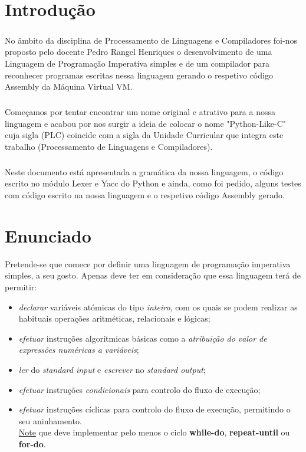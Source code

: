 \documentclass[11pt,a4paper]{report}
\begin{document}
    \tableofcontents

    \pagebreak


    \chapter{Introdução}
    \paragraph{}
    No âmbito da disciplina de Processamento de Linguagens e Compiladores foi-nos proposto pelo docente Pedro Rangel Henriques o desenvolvimento de uma Linguagem de Programação Imperativa simples e de um compilador para reconhecer programas escritas nessa linguagem gerando o respetivo código Assembly da Máquina Virtual VM.
    \paragraph{}
    Começamos por tentar encontrar um nome original e atrativo para a nossa linguagem e acabou por nos surgir a ideia de colocar o nome "Python-Like-C" cuja sigla (PLC) coincide com a sigla da Unidade Curricular que integra este trabalho (Processamento de Linguagens e Compiladores).
    \paragraph{}
    Neste documento está apresentada a gramática da nossa linguagem, o código escrito no módulo Lexer e Yacc do Python e ainda, como foi pedido, alguns testes com código escrito na nossa linguagem e o respetivo código Assembly gerado.


    \chapter{Enunciado}
    Pretende-se que comece por definir uma linguagem de programação imperativa simples, a seu gosto.
    Apenas deve ter em consideração que essa linguagem terá de permitir:
    \begin{itemize}
        \item \textit{declarar} variáveis atómicas do tipo \textit{inteiro}, com os quais se podem realizar as habituais operações aritméticas, relacionais e lógicas;
        \item \textit{efetuar} instruções algorítmicas básicas como a \textit{atribuição do valor de expressões numéricas a variáveis};
        \item \textit{ler} do \textit{standard input} e \textit{escrever} no \textit{standard output};
        \item \textit{efetuar} instruções \textit{condicionais} para controlo do fluxo de execução;
        \item \textit{efetuar} instruções cíclicas para controlo do fluxo de execução, permitindo o seu aninhamento.\\
    \underline{Note} que deve implementar pelo menos o ciclo \textbf{while-do}, \textbf{repeat-until} ou \textbf{for-do}.
    \end{itemize}
\end{document}
